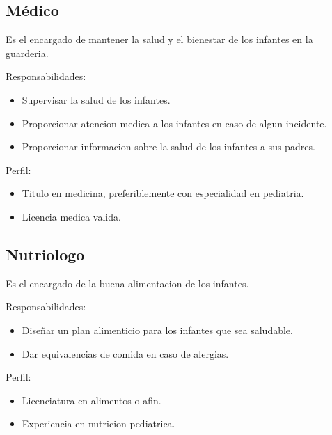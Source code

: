 \begin{Usuario}{\hypertarget{medico}{\subsection{Médico}}}{
	Es el encargado de mantener la salud y el bienestar de los infantes en la guarderia.
}
    \item[Responsabilidades:] \cdtEmpty
    \begin{itemize}
		\item Supervisar la salud de los infantes.
		\item Proporcionar atencion medica a los infantes en caso de algun incidente.
		\item Proporcionar informacion sobre la salud de los infantes a sus padres.
    \end{itemize}

	\item[Perfil:] \cdtEmpty
    \begin{itemize}
		\item Titulo en medicina, preferiblemente con especialidad en pediatria.
		\item Licencia medica valida.
    \end{itemize}
\end{Usuario}

\begin{Usuario}{\hypertarget{nutriologo}{\subsection{Nutriologo}}}{
	Es el encargado de la buena alimentacion de los infantes.
}
    \item[Responsabilidades:] \cdtEmpty
    \begin{itemize}
		\item Diseñar un plan alimenticio para los infantes que sea saludable.
		\item Dar equivalencias de comida en caso de alergias.
    \end{itemize}

	\item[Perfil:] \cdtEmpty
    \begin{itemize}
		\item Licenciatura en alimentos o afin.
		\item Experiencia en nutricion pediatrica.
    \end{itemize}
\end{Usuario}

